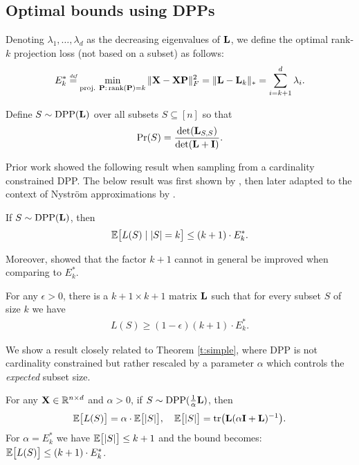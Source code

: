 \documentclass[12pt]{sty/colt2019/colt2018-arxiv}
\begin{document}
\subsection{Optimal bounds using DPPs}
Denoting $\lambda_1,\dots,\lambda_d$ as the decreasing eigenvalues of
$\mathbf{L}$, we define the optimal rank-$k$ projection loss (not based on a subset) as
follows:
\begin{align*}
  E_k^*\stackrel{\textit{\tiny{def}}}{=} \min_{\text{proj. }\mathbf P:\,\mathrm{rank}(\mathbf P)=k}\|\mathbf X-\mathbf X\mathbf P\|_F^2 = \|\mathbf{L}-\mathbf{L}_k\|_* =
  \sum_{i=k+1}^d\lambda_i.
\end{align*}
\begin{definition} Define $S\sim {\mathrm{DPP}}(\mathbf{L})$
  over all subsets $S\subseteq [n]$ so
  that \[\mathrm{Pr}(S)=\frac{\det(\mathbf{L}_{S,S})}{\det(\mathbf{L}+\mathbf I)}.\]
  \end{definition}
Prior work showed the following result when sampling from a
cardinality constrained DPP. The below result  was first shown by
\cite{pca-volume-sampling}, then later adapted to the context of
Nystr\"om approximations by \cite{belabbas-wolfe09}. 
\begin{theorem}\label{t:simple}
If $S\sim {\mathrm{DPP}}(\mathbf{L})$, then
  \begin{align*}
    \mathbb E\big[L(S)\mid |S|=k\big]\leq (k+1)\cdot E_k^*.
  \end{align*}
\end{theorem}
Moreover, \cite{pca-volume-sampling} showed that  the factor $k+1$
cannot in general be improved when comparing to $E_k^*$. 
\begin{theorem}\label{t:lower}
For any $\epsilon>0$, there is a $k+1\times k+1$  matrix $\mathbf{L}$ such
that for every subset $S$ of size $k$ we have
\begin{align*}
  L(S)\geq (1-\epsilon)(k+1)\cdot E_k^*.
\end{align*}
\end{theorem}
We show a result closely related to Theorem \ref{t:simple}, where DPP
is not cardinality constrained but rather rescaled by a parameter
$\alpha$ which controls the \emph{expected} subset size.
\begin{theorem}\label{t:main}
For any $\mathbf X\in\mathbb R^{n\times d}$ and $\alpha>0$, if $S\sim
{\mathrm{DPP}}(\frac1\alpha\mathbf{L})$, then
\begin{align*}
  \mathbb E\big[L(S)\big] =
  \alpha\cdot\mathbb E\big[|S|\big],\quad\mathbb E\big[|S|\big]=\mathrm{tr}\big(\mathbf{L}(\alpha\mathbf I+\mathbf{L})^{-1}\big). 
\end{align*}
For $\alpha=E_k^*$ we have $\mathbb E\big[|S|\big]\leq k+1$ and the bound
becomes: $\mathbb E\big[L(S)\big]\leq (k+1)\cdot E_k^*$.
\end{theorem}
\end{document}
